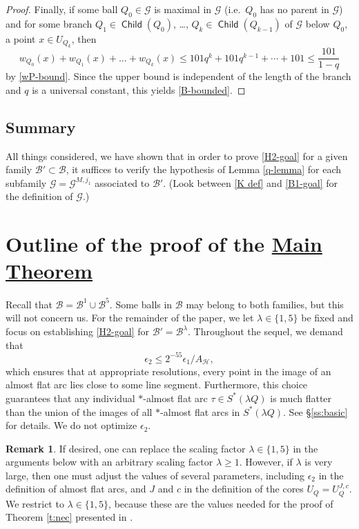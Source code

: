 \documentclass[12pt]{amsart}
\numberwithin{equation}{section}
\theoremstyle{plain}
\theoremstyle{definition}
\newtheorem{remark}[theorem]{Remark}
\newcommand{\Child}{\mathop\mathsf{Child}\nolimits}
\newcommand{\flatepsilon}{\epsilon_2}
\numberwithin{figure}{section}
\begin{document}
\begin{proof}
Finally, if some ball $Q_0\in\mathscr{G}$ is maximal in $\mathscr{G}$ (i.e.~$Q_0$ has no parent in $\mathscr{G}$) and for some branch $Q_1\in\Child(Q_0)$, \dots, $Q_k\in \Child(Q_{k-1})$ of $\mathscr{G}$ below $Q_0$, a point $x\in U_{Q_k}$, then $$w_{Q_0}(x)+w_{Q_1}(x)+\dots + w_{Q_k}(x) \leq 101q^k+ 101q^{k-1}+\cdots+101 \leq \frac{101}{1-q}$$ by \eqref{wP-bound}. Since the upper bound is independent of the length of the branch and $q$ is a universal constant, this yields \eqref{B-bounded}. \end{proof}

\subsection{Summary}\label{ss:summary} All things considered, we have shown that in order to prove \eqref{H2-goal} for a given family $\mathscr{B}' \subset\mathscr{B}$, it suffices to verify the hypothesis of Lemma \ref{q-lemma} for each subfamily $\mathscr{G}=\mathscr{G}^{M,j_1}$ associated to $\mathscr{B}'$. (Look between \eqref{K def} and \eqref{B1-goal} for the definition of $\mathscr{G}$.)

\section{Outline of the proof of the \texorpdfstring{\hyperref[t:main]{Main Theorem}}{Main Theorem}}\label{proof-main}
Recall that $\mathscr{B}=\mathscr{B}^1\cup\mathscr{B}^5$. Some balls in $\mathscr{B}$ may belong to both families, but this will not concern us. For the remainder of the paper, we let $\lambda\in\{1,5\}$ be fixed and focus on establishing \eqref{H2-goal} for $\mathscr{B}'=\mathscr{B}^\lambda$. Throughout the sequel, we demand that \begin{equation}\label{restrictions} \flatepsilon\leq 2^{-55}\epsilon_1/A_\mathscr{H},\end{equation} which ensures that at appropriate resolutions, every point in the image of an almost flat arc lies close to some line segment. Furthermore, this choice guarantees that any individual $*$-almost flat arc $\tau\in S^*(\lambda Q)$ is much flatter than the union of the images of all $*$-almost flat arcs in $S^*(\lambda Q)$. See \S\ref{ss:basic} for details. We do not optimize $\epsilon_2$.

\begin{remark}If desired, one can replace the scaling factor $\lambda\in\{1,5\}$ in the arguments below with an arbitrary scaling factor $\lambda\geq 1$. However, if $\lambda$ is very large, then one must adjust the values of several parameters, including $\epsilon_2$ in the definition of almost flat arcs, and $J$ and $c$ in the definition of the cores $U_Q=U_Q^{J,c}$. We restrict to $\lambda\in\{1,5\}$, because these are the values needed for the proof of Theorem \ref{t:nec} presented in \cite{Badger-McCurdy-1}.\end{remark}
\end{document}
